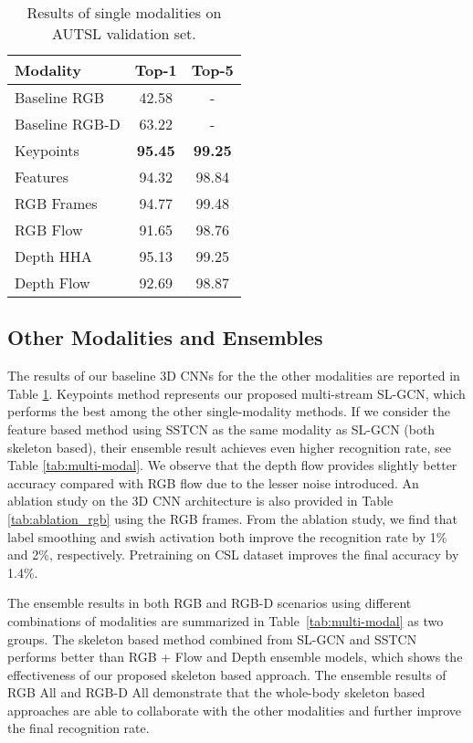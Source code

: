 \documentclass[final]{cvpr}
\begin{document}
\begin{table}[t]
\begin{center}
\begin{tabular}{l | c | c}
\hline
Modality & Top-1 & Top-5 \\
\hline
\hline
Baseline RGB & 42.58 & -\\
Baseline RGB-D & 63.22 & -\\
\hline
Keypoints       & \textbf{95.45} & \textbf{99.25}\\
Features        & 94.32 & 98.84\\
RGB Frames      & 94.77 & 99.48\\
RGB Flow        & 91.65 & 98.76\\
Depth HHA       & 95.13 & 99.25\\
Depth Flow      & 92.69 & 98.87\\
\hline
\end{tabular}\end{center}\caption{Results of single modalities on AUTSL validation set.}
\label{tab:validation_results_all}
\end{table}



\subsection{Other Modalities and Ensembles}
The results of our baseline 3D CNNs for the the other modalities are reported in Table \ref{tab:validation_results_all}. Keypoints method represents our proposed multi-stream SL-GCN, which performs the best among the other single-modality methods. If we consider the feature based method using SSTCN as the same modality as SL-GCN (both skeleton based), their ensemble result achieves even higher recognition rate, see Table \ref{tab:multi-modal}. 
We observe that the depth flow provides slightly better accuracy compared with RGB flow due to the lesser noise introduced. An ablation study on the 3D CNN architecture is also provided in Table \ref{tab:ablation_rgb} using the RGB frames. From the ablation study, we find that label smoothing and swish activation both improve the recognition rate by 1\% and 2\%, respectively. Pretraining on CSL dataset \cite{zhang2016chinese} improves the final accuracy by 1.4\%. 

The ensemble results in both RGB and RGB-D scenarios using different combinations of modalities are summarized in Table~\ref{tab:multi-modal} as two groups. The skeleton based method combined from SL-GCN and SSTCN performs better than RGB + Flow and Depth ensemble models, which shows the effectiveness of our proposed skeleton based approach. The ensemble results of RGB All and RGB-D All demonstrate that the whole-body skeleton based approaches are able to collaborate with the other modalities and further improve the final recognition rate. 
\end{document}
